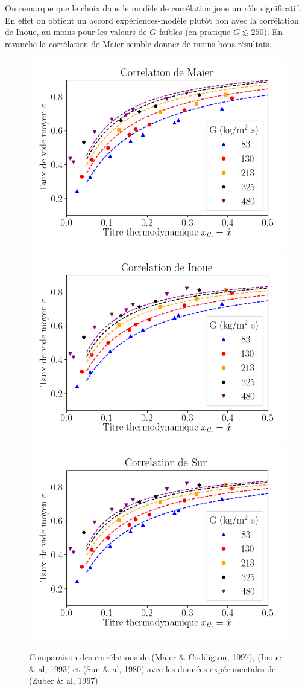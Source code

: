 On remarque que le choix dans le modèle de corrélation joue un rôle significatif. En effet on obtient un accord expériences-modèle plutôt bon avec la corrélation de Inoue, au moins pour les valeurs de $G$ faibles (en pratique $G\lesssim 250$). En revanche la corrélation de Maier semble donner de moins bons résultats.


\begin{figure}
    \centering
    \includegraphics[width=0.47\linewidth]{images/MaierCorrelation.png}
    \includegraphics[width=0.47\linewidth]{images/InoueCorrelation.png}
    \includegraphics[width=0.47\linewidth]{images/SunCorrelation.png}
    \caption{Comparaison des corrélations de (Maier \& Coddigton, 1997), (Inoue \& al, 1993) et (Sun \& al, 1980) avec les données expérimentales de (Zuber \& al, 1967)}
    \label{fig:Pb3CompExperiment}
\end{figure}